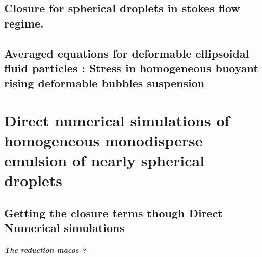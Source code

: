 \documentclass[12pt,a4paper]{My_book}
\begin{document}






\chapter{Closure for spherical droplets in stokes flow regime. }
\label{chap:daniel2}
\localtableofcontents






\chapter{Averaged equations for deformable ellipsoidal fluid particles : Stress in homogeneous buoyant rising deformable bubbles suspension }
\localtableofcontents







   

\part{Direct numerical simulations of homogeneous monodisperse emulsion of nearly spherical droplets}

\chapter{Getting the closure terms though Direct Numerical simulations}
\label{chap:DNS}
\localtableofcontents








\subsubsection{The reduction macos ? }
\end{document}
